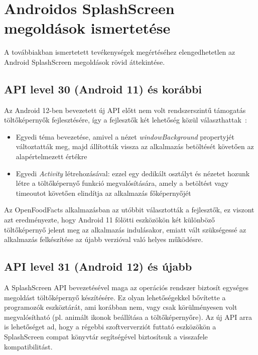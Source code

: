 \chapter{Androidos SplashScreen megoldások ismertetése}

A továbbiakban ismertetett tevékenységek megértéséhez elengedhetetlen
az Android SplashScreen megoldások rövid áttekintése.

\section{API level 30 (Android 11) és korábbi}
Az Android 12-ben bevezetett új API előtt nem volt rendszerszintű támogatás töltőképernyők
fejlesztésére, így a fejlesztők két lehetőség közül választhattak~\cite{splashscreenmigration}:
\begin{itemize}
 \item Egyedi téma bevezetése, amivel a nézet \textit{windowBackground} propertyjét változtatták meg,
 majd állították vissza az alkalmazás betöltését követően az alapértelmezett értékre
 \item Egyedi \textit{Activity} létrehozásával: ezzel egy dedikált osztályt és nézetet hozunk létre
 a töltőképernyő funkció megvalósítására, amely a betöltést vagy timeoutot követően elindítja
 az alkalmazás főképernyőjét %
\end{itemize}


Az OpenFoodFacts alkalmazásban az utóbbit választották a fejlesztők, ez viszont azt eredményezte,
hogy Android 11 fölötti eszközökön két különböző töltőképernyő jelent meg az alkalmazás indulásakor,
emiatt vált szükségessé az alkalmazás felkészítése az újabb verzióval való helyes működésre.

\section{API level 31 (Android 12) és újabb}
A SplashScreen API bevezetésével maga az operációs rendszer biztosít egységes megoldást
töltőképernyő készítésére. Ez olyan lehetőségekkel bővítette a programozók eszköztárát, ami korábban
nem, vagy csak körülményesen volt megvalósítható (pl. animált ikonok beállítása
a töltőképernyőre).
Az új API arra is lehetőséget ad, hogy a régebbi szoftververziót futtató eszközökön a SplashScreen
compat könyvtár %
segítségével biztosítsuk a visszafele kompatibilitást.
